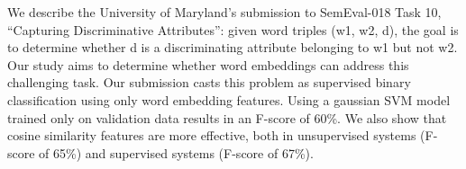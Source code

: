 We describe the University of Maryland's submission to SemEval-018 Task 10, ``Capturing Discriminative Attributes'': given word triples (w1, w2, d), the goal is to determine whether d is a discriminating attribute belonging to w1 but not w2. Our study aims to determine whether word embeddings can address this challenging task. Our submission casts this problem as supervised binary classification using only word embedding features. Using a gaussian SVM model trained only on validation data results in an F-score of 60\%. We also show that cosine similarity features are more effective, both in unsupervised systems (F-score of 65\%) and supervised systems (F-score of 67\%).
